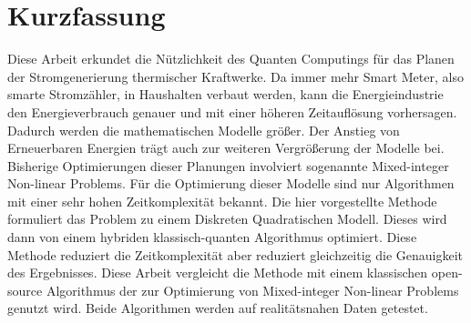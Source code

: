 \section*{Kurzfassung}

Diese Arbeit erkundet die Nützlichkeit des Quanten Computings für das Planen der Stromgenerierung thermischer Kraftwerke.
Da immer mehr Smart Meter, also smarte Stromzähler, in Haushalten verbaut werden, kann die Energieindustrie den Energieverbrauch genauer und mit einer höheren Zeitauflösung vorhersagen.
Dadurch werden die mathematischen Modelle größer.
Der Anstieg von Erneuerbaren Energien trägt auch zur weiteren Vergrößerung der Modelle bei.
Bisherige Optimierungen dieser Planungen involviert sogenannte Mixed-integer Non-linear Problems.
Für die Optimierung dieser Modelle sind nur Algorithmen mit einer sehr hohen Zeitkomplexität bekannt.
Die hier vorgestellte Methode formuliert das Problem zu einem Diskreten Quadratischen Modell.
Dieses wird dann von einem hybriden klassisch-quanten Algorithmus optimiert.
Diese Methode reduziert die Zeitkomplexität aber reduziert gleichzeitig die Genauigkeit des Ergebnisses.
Diese Arbeit vergleicht die Methode mit einem klassischen open-source Algorithmus der zur Optimierung von Mixed-integer Non-linear Problems genutzt wird.
Beide Algorithmen werden auf realitätsnahen Daten getestet.
